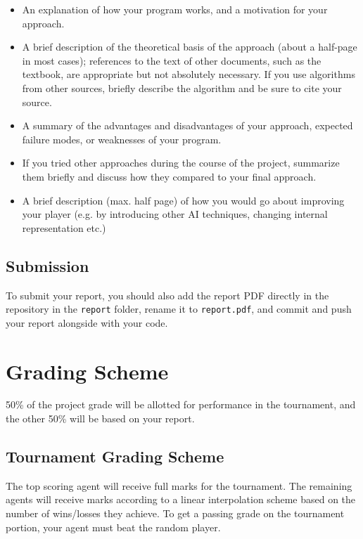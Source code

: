 \documentclass[twoside,11pt]{article}
\begin{document}
\begin{itemize}
    \item An explanation of how your program works, and a motivation for your approach.
    \item A brief description of the theoretical basis of the approach (about a half-page in most cases); references to the text of other documents, such as the textbook, are appropriate but not absolutely necessary. If you use algorithms from other sources, briefly describe the algorithm and be sure to cite your source.
    \item A summary of the advantages and disadvantages of your approach, expected failure modes, or weaknesses of your program.
    \item If you tried other approaches during the course of the project, summarize them briefly and discuss how they compared to your final approach.
    \item A brief description (max. half page) of how you would go about improving your player (e.g. by introducing other AI techniques, changing internal representation etc.)
    
\end{itemize}

\subsection{Submission}

To submit your report, you should also add the report PDF directly in the repository in the \texttt{report} folder, rename it to \texttt{report.pdf}, and commit and push your report alongside with your code.

\section{Grading Scheme}

50\% of the project grade will be allotted for performance in the tournament, and the other 50\% will be based on your report.

\subsection{Tournament Grading Scheme}

The top scoring agent will receive full marks for the tournament. The remaining agents will receive marks according to a linear interpolation scheme based on the number of wins/losses they achieve. To get a passing grade on the tournament portion, your agent must beat the random player.
\end{document}
